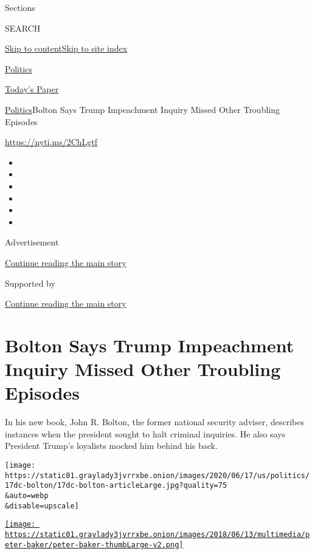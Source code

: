 Sections

SEARCH

\protect\hyperlink{site-content}{Skip to
content}\protect\hyperlink{site-index}{Skip to site index}

\href{https://www.nytimes3xbfgragh.onion/section/politics}{Politics}

\href{https://myaccount.nytimes3xbfgragh.onion/auth/login?response_type=cookie\&client_id=vi}{}

\href{https://www.nytimes3xbfgragh.onion/section/todayspaper}{Today's
Paper}

\href{/section/politics}{Politics}\textbar{}Bolton Says Trump
Impeachment Inquiry Missed Other Troubling Episodes

\url{https://nyti.ms/2ChLgtf}

\begin{itemize}
\item
\item
\item
\item
\item
\item
\end{itemize}

Advertisement

\protect\hyperlink{after-top}{Continue reading the main story}

Supported by

\protect\hyperlink{after-sponsor}{Continue reading the main story}

\hypertarget{bolton-says-trump-impeachment-inquiry-missed-other-troubling-episodes}{%
\section{Bolton Says Trump Impeachment Inquiry Missed Other Troubling
Episodes}\label{bolton-says-trump-impeachment-inquiry-missed-other-troubling-episodes}}

In his new book, John R. Bolton, the former national security adviser,
describes instances when the president sought to halt criminal
inquiries. He also says President Trump's loyalists mocked him behind
his back.

\texttt{[image: https://static01.graylady3jvrrxbe.onion/images/2020/06/17/us/politics/17dc-bolton/17dc-bolton-articleLarge.jpg?quality=75\\\&auto=webp\\\&disable=upscale]}

\href{https://www.nytimes3xbfgragh.onion/by/peter-baker}{\texttt{[image: https://static01.graylady3jvrrxbe.onion/images/2018/06/13/multimedia/peter-baker/peter-baker-thumbLarge-v2.png]}}


